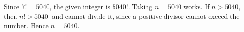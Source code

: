 Since $7!=5040$, the given integer is $5040!$. Taking $n=5040$ works. If $n>5040$, then $n!>5040!$ and cannot divide it, since a positive divisor cannot exceed the number. Hence $\boxed{n=5040}$.

